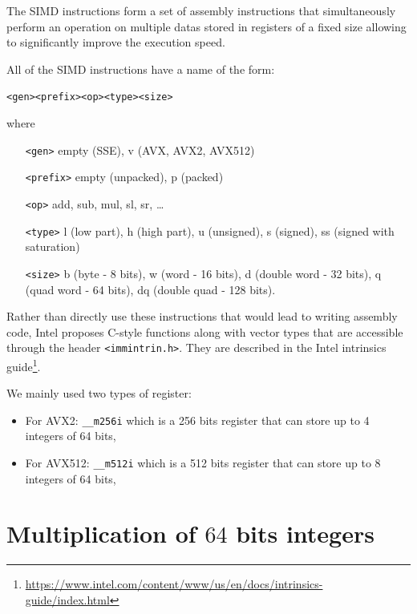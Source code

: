 \documentclass[a4paper]{article}
\begin{document}
The SIMD instructions form a set of assembly instructions that simultaneously perform an operation on multiple datas stored in registers
of a fixed size allowing to significantly improve the execution speed.

All of the SIMD instructions have a name of the form:
\begin{center} 
    \texttt{<gen><prefix><op><type><size>}
\end{center}

where
\begin{center}
    \begin{minipage}{12cm}
        \begin{itemize}
            \item[\texttt{<gen>}] empty (SSE), v (AVX, AVX2, AVX512)
            \item[\texttt{<prefix>}] empty (unpacked), p (packed)
            \item[\texttt{<op>}] add, sub, mul, sl, sr, \dots
            \item[\texttt{<type>}] l (low part), h (high part), u (unsigned), s (signed), ss (signed with saturation)
            \item[\texttt{<size>}] b (byte - 8 bits), w (word - 16 bits), d (double word - 32 bits), q (quad word - 64 bits), 
            dq (double quad - 128 bits).
        \end{itemize}
    \end{minipage}
\end{center}

\bigskip
Rather than directly use these instructions that would lead to writing assembly code, Intel proposes C-style functions
along with vector types that are accessible through the header \texttt{<immintrin.h>}.
They are described in the Intel intrinsics guide\footnote{\url{https://www.intel.com/content/www/us/en/docs/intrinsics-guide/index.html}}.

\bigskip
We mainly used two types of register: 
\begin{itemize}
    \item For AVX2: \texttt{\_\_m256i} which is a 256 bits register that can store up to 4 integers of 64 bits,
    \item For AVX512: \texttt{\_\_m512i} which is a 512 bits register that can store up to 8 integers of 64 bits,
\end{itemize}


\section{Multiplication of $64$ bits integers}
\end{document}
